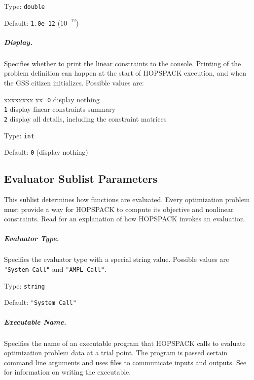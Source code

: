 \hspace{0.2in}
Type: {\tt double}

\hspace{0.2in}
Default: {\tt 1.0e-12} ($10^{-12}$)

\subparagraph{Display.}  \label{param:LC-display}
Specifies whether to print the linear constraints to the console.
Printing of the problem definition can happen at the start of HOPSPACK execution,
and when the GSS citizen initializes.  Possible values are:
\begin{tabbing}
  xxxxxxxx \= xx \= \kill
     \> {\tt 0} \> display nothing \\
     \> {\tt 1} \> display linear constraints summary  \\
     \> {\tt 2} \> display all details, including the constraint matrices
\end{tabbing}

\hspace{0.2in}
Type: {\tt int}

\hspace{0.2in}
Default: {\tt 0} (display nothing)



\subsection{Evaluator Sublist Parameters}
\label{subconfig:EV}

This sublist determines how functions are evaluated.
Every optimization problem must provide a way for HOPSPACK to compute its
objective and nonlinear constraints.
Read  for an explanation of how HOPSPACK invokes
an evaluation.

\subparagraph{Evaluator Type.}  \label{param:EV-type}
Specifies the evaluator type with a special string value.
Possible values are {\tt "System Call"} and {\tt "AMPL Call"}.

\hspace{0.2in}
Type: {\tt string}

\hspace{0.2in}
Default: {\tt "System Call"}

\subparagraph{Executable Name.}  \label{param:EV-execname}
Specifies the name of an executable program that HOPSPACK calls to evaluate
optimization problem data at a trial point.  The program is passed certain
command line arguments and uses files to communicate inputs and outputs.
See  for information on writing the executable.


